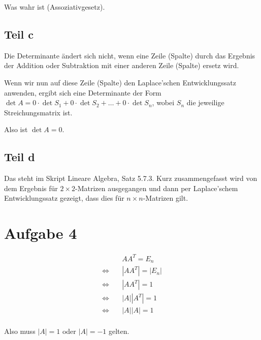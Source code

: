 \documentclass[a4paper,german,12pt,smallheadings]{scrartcl}
\begin{document}
Was wahr ist (Assoziativgesetz).

\subsection*{Teil c}
Die Determinante ändert sich nicht, wenn eine Zeile (Spalte) durch das Ergebnis
der Addition oder Subtraktion mit einer anderen Zeile (Spalte) ersetz wird.

Wenn wir nun auf diese Zeile (Spalte) den Laplace'schen Entwicklungssatz
anwenden, ergibt sich eine Determinante der Form $\det A = 0 \cdot \det S_1 + 0
\cdot \det S_2 + \dots + 0 \cdot \det S_n$, wobei $S_n$ die jeweilige
Streichungsmatrix ist.

Also ist $\det A = 0$.

\subsection*{Teil d}

Das steht im Skript Lineare Algebra, Satz 5.7.3. Kurz zusammengefasst wird von
dem Ergebnis für $2\times2$-Matrizen ausgegangen und dann per Laplace'schem
Entwicklungssatz gezeigt, dass dies für $n\times n$-Matrizen gilt.

\section{Aufgabe 4}
\begin{align*}
  &AA^T = E_n\\
  \Leftrightarrow\quad&|AA^T| = |E_n| \\
  \Leftrightarrow\quad&|AA^T| = 1 \\
  \Leftrightarrow\quad&|A||A^T| = 1 \\
  \Leftrightarrow\quad&|A||A| = 1 \\
\end{align*}

Also muss $|A| = 1$ oder $|A| = -1$ gelten.
\end{document}
